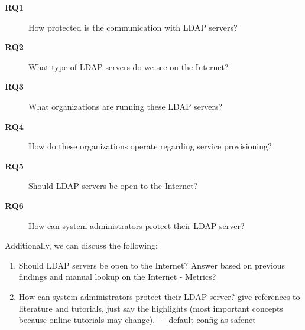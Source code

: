 \begin{description} 
    \item[\textbf{RQ1}] How protected is the communication with \gls{LDAP} servers? 
    \item[\textbf{RQ2}] What type of \gls{LDAP} servers do we see on the Internet?
    \item[\textbf{RQ3}] What organizations are running these \gls{LDAP} servers?
    \item[\textbf{RQ4}] How do these organizations operate regarding service provisioning?
    \item[\textbf{RQ5}] Should \gls{LDAP} servers be open to the Internet?
    \item[\textbf{RQ6}] How can system administrators protect their \gls{LDAP} server?
\end{description}

Additionally, we can discuss the following:
\begin{enumerate}
    \item Should \gls{LDAP} servers be open to the Internet? Answer based on previous findings and manual lookup on the Internet - Metrics?
    \item How can system administrators protect their \gls{LDAP} server? give references to literature and tutorials, just say the highlights (most important concepts because online tutorials may change).  -  - default config as safenet
\end{enumerate}
\fi







